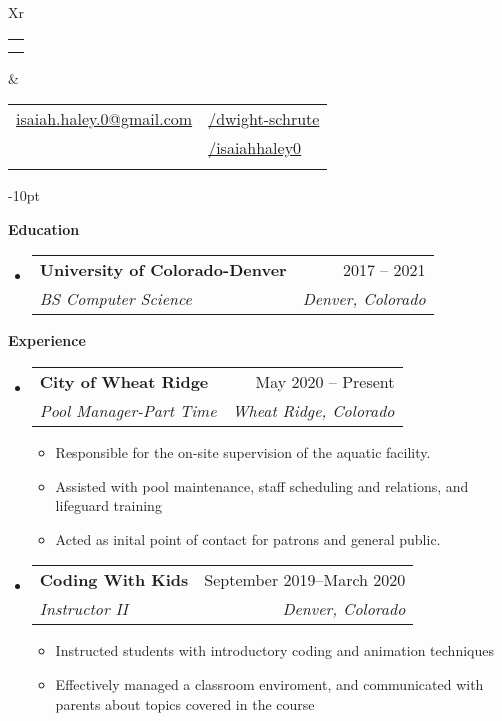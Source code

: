 \documentclass[letterpaper,12pt]{article}[leftmargin=*]
\makeatletter
\def \fullname {Isaiah Haley}
\def \subtitle {}
\def \linkedinicon {\faLinkedin}
\def \linkedinlink {https://linkedin.com/in/dwight-schrute/}
\def \linkedintext {/dwight-schrute}
\def \phoneicon {\faPhone}
\def \phonetext {303-885-3465}
\def \emailicon {\faEnvelope}
\def \emaillink {mailto:isaiah.haley.0@gmail.com}
\def \emailtext {isaiah.haley.0@gmail.com}
\def \githubicon {\faGithub}
\def \githublink {https://github.com/isaiahhaley0}
\def \githubtext {/isaiahhaley0}
\def \headertype {\doublecol} %
\def \entryspacing {-0pt}
\def \linkedin {\linkedinicon \hspace{3pt}\href{\linkedinlink}{\linkedintext}}
\def \phone {\phoneicon \hspace{3pt}{ \phonetext}}
\def \email {\emailicon \hspace{3pt}\href{\emaillink}{\emailtext}}
\def \github {\githubicon \hspace{3pt}\href{\githublink}{\githubtext}}
\renewcommand{\section}[2]{\vspace{5pt}
  \colorbox{secondary}{\color{white}\raggedbottom\normalsize\textbf{{#1}{\hspace{7pt}#2}}}
}
\newcommand{\resumeEntryStart}{\begin{itemize}[leftmargin=2.5mm]}
\newcommand{\resumeEntryEnd}{\end{itemize}\vspace{\entryspacing}}
\newcommand{\resumeItemListStart}{\begin{itemize}[leftmargin=4.5mm]}
\newcommand{\resumeItemListEnd}{\end{itemize}}
\newcommand{\resumeItem}[1]{
  \item\small{
    {#1 \vspace{-2pt}}
  }
}
\newcommand{\resumeEntryTSDL}[4]{
  \vspace{-1pt}\item[]
    \begin{tabularx}{0.97\textwidth}{X@{\hspace{60pt}}r}
      \textbf{\color{primary}#1} & {\firabook\color{accent}\small#2} \\
      \textit{\color{accent}\small#3} & \textit{\color{accent}\small#4} \\
    \end{tabularx}\vspace{-6pt}
}
\newcommand{\doublecol}[6]{
  \begin{tabularx}{\textwidth}{Xr}
    {
      \begin{tabular}[c]{l}
        \fontsize{35}{45}\selectfont{\color{primary}{{\textbf{\fullname}}}} \\
        {\textit{\subtitle}} %
      \end{tabular}
    } & {
      \begin{tabular}[c]{l@{\hspace{1.5em}}l}
        {\small#4} & {\small#1} \\
        {\small#5} & {\small#2} \\
        {\small#6} & {\small#3}
      \end{tabular}
    }
  \end{tabularx}
}
\newcommand{\singlecol}[6]{
  \begin{tabularx}{\textwidth}{Xr}
    {
      \begin{tabular}[b]{l}
        \fontsize{35}{45}\selectfont{\color{primary}{{\textbf{\fullname}}}} \\
        {\textit{\subtitle}} %
      \end{tabular}
    } & {
      \begin{tabular}[c]{l}
        {\small#1} \\
        {\small#2} \\
        {\small#3} \\
        {\small#4} \\
        {\small#5} \\
        {\small#6}
      \end{tabular}
    }
  \end{tabularx}
}
\makeatother
\begin{document}


\headertype{\linkedin}{\github}{\phone}{\email}{} %
 
\vspace{-10pt} %

\section{\faGraduationCap}{Education}

  \resumeEntryStart
    \resumeEntryTSDL
      {University of Colorado-Denver}{2017 -- 2021}
      {BS Computer Science}{Denver, Colorado}
  \resumeEntryEnd

\section{\faPieChart}{Experience}

  \resumeEntryStart
    \resumeEntryTSDL
      {City of Wheat Ridge}{May 2020 -- Present}
      {Pool Manager-Part Time}{Wheat Ridge, Colorado}
    \resumeItemListStart
      \resumeItem {Responsible for the on-site supervision of the aquatic facility.}
      \resumeItem {Assisted with pool maintenance, staff scheduling and relations, and lifeguard training}
      \resumeItem {Acted as inital point of contact for patrons and general public.}
    \resumeItemListEnd
  \resumeEntryEnd

  \resumeEntryStart
    \resumeEntryTSDL
      {Coding With Kids}{September 2019--March 2020}
      {Instructor II}{Denver, Colorado}
    \resumeItemListStart
      \resumeItem {Instructed students with introductory coding and animation techniques}
      \resumeItem {Effectively managed a classroom enviroment, and communicated with parents about topics covered in the course} 
    \resumeItemListEnd
  \resumeEntryEnd



\end{document}

